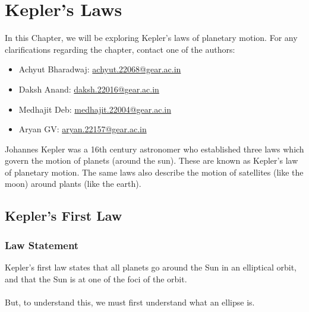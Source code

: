 \documentclass[a4paper]{report}
\begin{document}
\chapter{Kepler's Laws}
In this Chapter, we will be exploring Kepler's laws of planetary motion. 
For any clarifications regarding the chapter, contact one of the authors: 
\begin{itemize}
  \item Achyut Bharadwaj: \href{mailto:achyut.22068@gear.ac.in}{achyut.22068@gear.ac.in}
  \item Daksh Anand: \href{mailto:daksh.22016@gear.ac.in}{daksh.22016@gear.ac.in}
  \item Medhajit Deb: \href{mailto:medhajit.22004@gear.ac.in}{medhajit.22004@gear.ac.in}
  \item Aryan GV: \href{mailto:aryan.22157@gear.ac.in}{aryan.22157@gear.ac.in}
\end{itemize}
Johannes Kepler was a 16th century astronomer who established three laws which govern the motion 
    of planets (around the sun). These are known as Kepler’s law of planetary motion. The same laws also 
    describe the motion of satellites (like the moon) around plants (like the earth).
\section{Kepler's First Law}
\subsection{Law Statement}
Kepler's first law states that all planets go around the Sun in an elliptical orbit, and that the Sun is 
at one of the foci of the orbit.\\\\
But, to understand this, we must first understand what an ellipse is.
\end{document}
